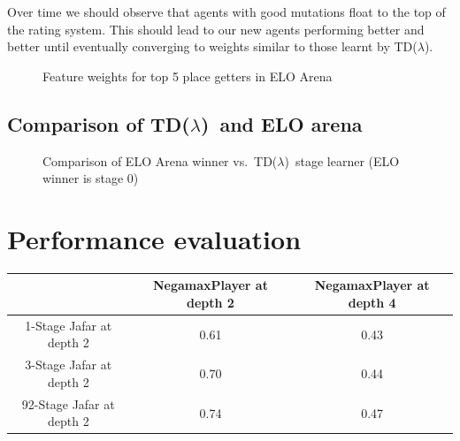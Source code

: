 \documentclass[11pt]{article}
\newcommand{\tdl}{TD($\lambda$)}
\begin{document}
Over time we should observe that agents with good mutations float to the top of the rating system.
This should lead to our new agents performing better and better until eventually
converging to weights similar to those learnt by \tdl.

\begin{figure}[htbp]
  \centering
  \caption{Feature weights for top 5 place getters in ELO Arena}
  \label{fig:elo_arena_weights}
\end{figure}

\subsection{Comparison of \tdl\ and ELO arena}
\label{sub:comparing_learning}

\begin{figure}[htbp]
  \centering
  \caption{Comparison of ELO Arena winner vs.\ \tdl\ stage
    learner (ELO winner is stage 0)}
  \label{fig:elo_arena_comp}
\end{figure}

\section{Performance evaluation}
\label{sec:performance}
\begin{tabular}{c c c}
  \toprule
      & NegamaxPlayer at depth 2  & NegamaxPlayer at depth 4  \\
    \midrule
1-Stage Jafar at depth 2  & 0.61 & 0.43 \\ 
3-Stage Jafar at depth 2    & 0.70 & 0.44\\ 
92-Stage Jafar at depth 2   & 0.74 & 0.47\\
\bottomrule
\end{tabular}
\end{document}
